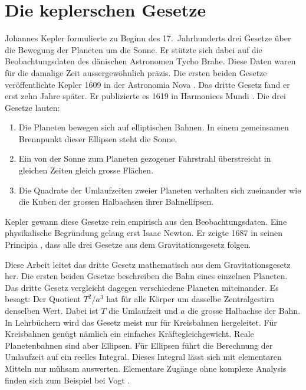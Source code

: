 %
%
%
\section{Die keplerschen Gesetze
\label{kepler:section:einleitung}}
%

Johannes Kepler formulierte zu Beginn des 17.~Jahrhunderts drei Gesetze über die Bewegung der Planeten um die Sonne.
%
%
%
Er stützte sich dabei auf die Beobachtungsdaten des dänischen Astronomen Tycho Brahe.
Diese Daten waren für die damalige Zeit aussergewöhnlich präzis.
%
Die ersten beiden Gesetze veröffentlichte Kepler 1609 in der Astronomia Nova \cite{kepler:astronomianova}.
%
Das dritte Gesetz fand er erst zehn Jahre später.
Er publizierte es 1619 in Harmonices Mundi \cite{kepler:harmonices}.
%
Die drei Gesetze lauten:
\begin{enumerate}
\item
Die Planeten bewegen sich auf elliptischen Bahnen.
In einem gemeinsamen Brennpunkt dieser Ellipsen steht die Sonne.
%
\item
Ein von der Sonne zum Planeten gezogener Fahrstrahl überstreicht in gleichen Zeiten gleich grosse Flächen.
%
%
\item
Die Quadrate der Umlaufzeiten zweier Planeten verhalten sich zueinander wie die Kuben der grossen Halbachsen ihrer Bahnellipsen.
\end{enumerate}
Kepler gewann diese Gesetze rein empirisch aus den Beobachtungsdaten.
Eine physikalische Begründung gelang erst Isaac Newton.
%
Er zeigte 1687 in seinen Principia \cite{kepler:principia}, dass alle drei Gesetze aus dem Gravitationsgesetz folgen.
%
%

Diese Arbeit leitet das dritte Gesetz mathematisch aus dem Gravitationsgesetz her.
Die ersten beiden Gesetze beschreiben die Bahn eines einzelnen Planeten.
Das dritte Gesetz vergleicht dagegen verschiedene Planeten miteinander.
Es besagt: Der Quotient $T^2/a^3$ hat für alle Körper um dasselbe Zentralgestirn denselben Wert.
Dabei ist $T$ die Umlaufzeit und $a$ die grosse Halbachse der Bahn.
%
In Lehrbüchern wird das Gesetz meist nur für Kreisbahnen hergeleitet.
Für Kreisbahnen genügt nämlich ein einfaches Kräftegleichgewicht.
Reale Planetenbahnen sind aber Ellipsen.
Für Ellipsen führt die Berechnung der Umlaufzeit auf ein reelles Integral.
Dieses Integral lässt sich mit elementaren Mitteln nur mühsam auswerten.
Elementare Zugänge ohne komplexe Analysis finden sich zum Beispiel bei Vogt \cite{kepler:vogt}.

